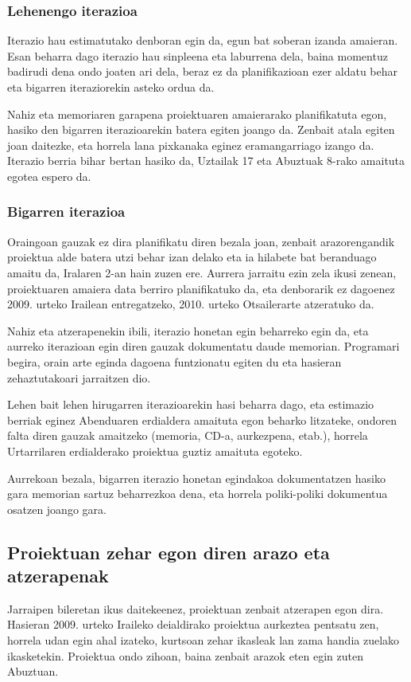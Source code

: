 \subsubsection{Lehenengo iterazioa}
Iterazio hau estimatutako denboran egin da, egun bat soberan izanda amaieran. Esan beharra dago iterazio hau sinpleena eta laburrena dela, baina momentuz badirudi dena ondo joaten ari dela, beraz ez da planifikazioan ezer aldatu behar eta bigarren iteraziorekin asteko ordua da.

Nahiz eta memoriaren garapena proiektuaren amaierarako planifikatuta egon, hasiko den bigarren iterazioarekin batera egiten joango da. Zenbait atala egiten joan daitezke, eta horrela lana pixkanaka eginez eramangarriago izango da. Iterazio berria bihar bertan hasiko da, Uztailak 17 eta Abuztuak 8-rako amaituta egotea espero da.

\subsubsection{Bigarren iterazioa}
Oraingoan gauzak ez dira planifikatu diren bezala joan, zenbait arazorengandik proiektua alde batera utzi behar izan delako eta ia hilabete bat beranduago amaitu da, Iralaren 2-an hain zuzen ere. Aurrera jarraitu ezin zela ikusi zenean, proiektuaren amaiera data berriro planifikatuko da, eta denborarik ez dagoenez 2009. urteko Irailean entregatzeko, 2010. urteko Otsailerarte atzeratuko da.

Nahiz eta atzerapenekin ibili, iterazio honetan egin beharreko egin da, eta aurreko iterazioan egin diren gauzak dokumentatu daude memorian. Programari begira, orain arte eginda dagoena funtzionatu egiten du eta hasieran zehaztutakoari jarraitzen dio.

Lehen bait lehen hirugarren iterazioarekin hasi beharra dago, eta estimazio berriak eginez Abenduaren erdialdera amaituta egon beharko litzateke, ondoren falta diren gauzak amaitzeko (memoria, CD-a, aurkezpena, etab.), horrela Urtarrilaren erdialderako proiektua guztiz amaituta egoteko.

Aurrekoan bezala, bigarren iterazio honetan egindakoa dokumentatzen hasiko gara memorian sartuz beharrezkoa dena, eta horrela poliki-poliki dokumentua osatzen joango gara.

\subsection{Proiektuan zehar egon diren arazo eta atzerapenak}
Jarraipen bileretan ikus daitekeenez, proiektuan zenbait atzerapen egon dira. Hasieran 2009. urteko Iraileko deialdirako proiektua aurkeztea pentsatu zen, horrela udan egin ahal izateko, kurtsoan zehar ikasleak lan zama handia zuelako ikasketekin. Proiektua ondo zihoan, baina zenbait arazok eten egin zuten Abuztuan.

